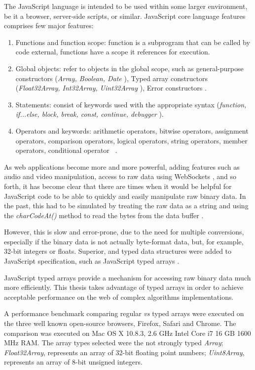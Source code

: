 The JavaScript language is intended to be used within some larger environment, be it a browser, server-side scripts, or similar. JavaScript core language features comprises few major features:

\begin{enumerate}
\item Functions and function scope: function is a subprogram that can be called by code external, functions have a scope it references for execution.
\item Global objects: refer to objects in the global scope, such as general-purpose constructors (\textit{Array, Boolean, Date} \etc), Typed array constructors (\textit{Float32Array, Int32Array, Uint32Array} \etc), Error constructors \etc.
\item Statements: consist of keywords used with the appropriate syntax (\textit{function, if...else, block, break, const, continue, debugger \etc}).
\item Operators and keywords: arithmetic operators, bitwise operators, assignment operators, comparison operators, logical operators, string operators, member operators, conditional operator \etc\ \cite{MDN2013}.
\end{enumerate}

As web applications become more and more powerful, adding features such as audio and video manipulation, access to raw data using WebSockets \cite{MDN2013}, and so forth, it has become clear that there are times when it would be helpful for JavaScript code to be able to quickly and easily manipulate raw binary data. In the past, this had to be simulated by treating the raw data as a string and using the \textit{charCodeAt()} method to read the bytes from the data buffer \cite{MDN2013} \cite{TypedArray2013}.

However, this is slow and error-prone, due to the need for multiple conversions, especially if the binary data is not actually byte-format data, but, for example, 32-bit integers or floats. Superior, and typed data structures were added to JavaScript specification, such as JavaScript typed arrays \cite{International2009}.

JavaScript typed arrays provide a mechanism for accessing raw binary data much more efficiently. This thesis takes advantage of typed arrays in order to achieve acceptable performance on the web of complex algorithms implementations.

A performance benchmark comparing regular \textit{vs} typed arrays were executed on the three well known open-source browsers, Firefox, Safari and Chrome. The comparison was executed on Mac OS X 10.8.3, 2.6 GHz Intel Core i7 16 GB 1600 MHz RAM. The array types selected were the not strongly typed \textit{Array}; \textit{Float32Array}, represents an array of 32-bit floating point numbers; \textit{Uint8Array}, represents an array of 8-bit unsigned integers.


